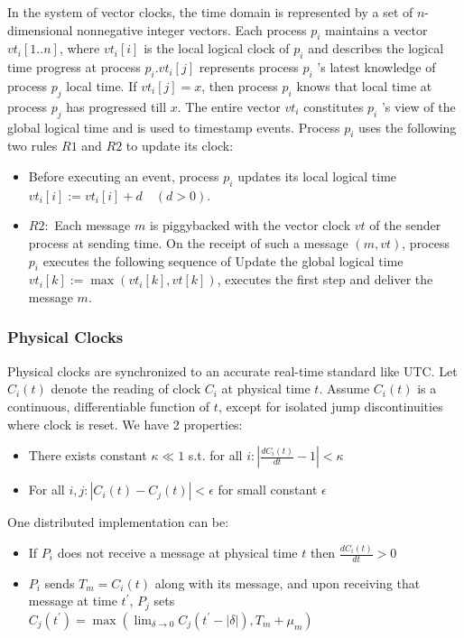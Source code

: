 \documentclass[acmlarge]{acmart}
\begin{document}
In the system of vector clocks, the time domain is represented by a set of $n$-dimensional nonnegative integer vectors. Each process $p_{i}$ maintains a vector $v t_{i}[1 . . n]$, where $v t_{i}[i]$ is the local logical clock of $p_{i}$ and describes the logical time progress at process $p_{i} . v t_{i}[j]$ represents process $p_{i}$ 's latest knowledge of process $p_{j}$ local time. If $v t_{i}[j]=x$, then process $p_{i}$ knows that local time at process $p_{j}$ has progressed till $x$. The entire vector $v t_{i}$ constitutes $p_{i}$ 's view of the global logical time and is used to timestamp events.
Process $p_{i}$ uses the following two rules $R 1$ and $R 2$ to update its clock:

\begin{itemize}
  \item Before executing an event, process $p_{i}$ updates its local logical time $v t_{i}[i]:=v t_{i}[i]+d \quad(d>0)$.
  \item $R 2:$ Each message $m$ is piggybacked with the vector clock $v t$ of the sender process at sending time. On the receipt of such a message $(m, v t)$, process $p_{i}$ executes the following sequence of Update the global logical time $v t_{i}[k]:=\max \left(v t_{i}[k], v t[k]\right)$, executes the first step and deliver the message $m$.
\end{itemize}
\subsubsection{Physical Clocks}
Physical clocks are synchronized to an accurate real-time standard like UTC. Let $C_{i}(t)$ denote the reading of clock $C_{i}$ at physical time $t$. Assume $C_{i}(t)$ is a continuous, differentiable function of $t$, except for isolated jump discontinuities where clock is reset. We have 2 properties:
\begin{itemize}
  \item There exists constant $\kappa \ll 1$ s.t. for all $i:\left|\frac{d C_{i}(t)}{d t}-1\right|<\kappa$
  \item For all $i, j:\left|C_{i}(t)-C_{j}(t)\right|<\epsilon$ for small constant $\epsilon$
\end{itemize}

One distributed implementation can be:
\begin{itemize}
  \item If $P_{i}$ does not receive a message at physical time $t$ then $\frac{d C_{i}(t)}{d t}>0$
  \item $P_{i}$ sends $T_{m}=C_{i}(t)$ along with its message, and upon receiving that message at time $t^{\prime}$,
        $P_{j}$ sets $C_{j}\left(t^{\prime}\right)=\max \left(\lim _{\delta \rightarrow 0} C_{j}\left(t^{\prime}-|\delta|\right), T_{m}+\mu_{m}\right)$
\end{itemize}
\end{document}
